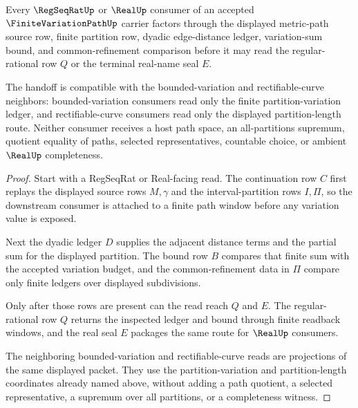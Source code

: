 \begin{theorem}
\label{thm:finite-variation-path-regseqrat-real-handoff}
Every $\RegSeqRatUp$ or $\RealUp$ consumer of an accepted $\FiniteVariationPathUp$ carrier factors through the displayed metric-path source row, finite partition row, dyadic edge-distance ledger, variation-sum bound, and common-refinement comparison before it may read the regular-rational row $Q$ or the terminal real-name seal $E$.

The handoff is compatible with the bounded-variation and rectifiable-curve neighbors: bounded-variation consumers read only the finite partition-variation ledger, and rectifiable-curve consumers read only the displayed partition-length route. Neither consumer receives a host path space, an all-partitions supremum, quotient equality of paths, selected representatives, countable choice, or ambient $\RealUp$ completeness.
\end{theorem}
\begin{proof}
Start with a RegSeqRat or Real-facing read. The continuation row $C$ first replays the displayed source rows $M,\gamma$ and the interval-partition rows $I,\Pi$, so the downstream consumer is attached to a finite path window before any variation value is exposed.

Next the dyadic ledger $D$ supplies the adjacent distance terms and the partial sum for the displayed partition. The bound row $B$ compares that finite sum with the accepted variation budget, and the common-refinement data in $\Pi$ compare only finite ledgers over displayed subdivisions.

Only after those rows are present can the read reach $Q$ and $E$. The regular-rational row $Q$ returns the inspected ledger and bound through finite readback windows, and the real seal $E$ packages the same route for $\RealUp$ consumers.

The neighboring bounded-variation and rectifiable-curve reads are projections of the same displayed packet. They use the partition-variation and partition-length coordinates already named above, without adding a path quotient, a selected representative, a supremum over all partitions, or a completeness witness.
\end{proof}


